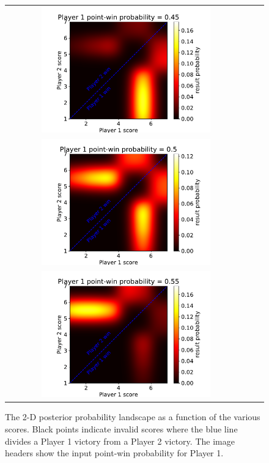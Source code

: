 \documentclass[10pt]{article}
\begin{document}
\begin{figure}
\centering
	\begin{tabular}{@{}ccc@{}}
	\includegraphics[width=0.72\textwidth]{tenplot_point4.pdf}\\
	\includegraphics[width=0.72\textwidth]{tenplot_point5.pdf}\\
	\includegraphics[width=0.72\textwidth]{tenplot_point6.pdf}
	\end{tabular}
    \caption{The 2-D posterior probability landscape as a function of the various scores. Black points indicate invalid scores where the blue line divides a Player 1 victory from a Player 2 victory. The image headers show the input point-win probability for Player 1.}
    \label{fig_posterior}
\end{figure}
\end{document}
